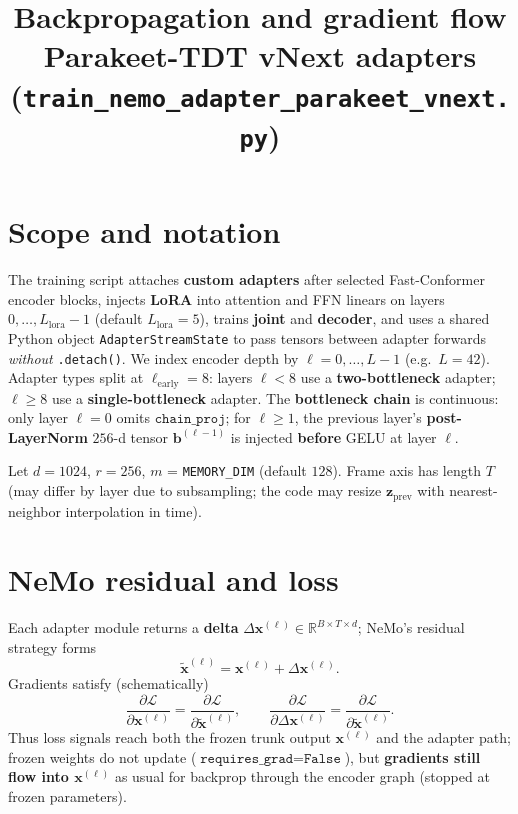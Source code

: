 \documentclass[11pt]{article}
\title{Backpropagation and gradient flow\\Parakeet-TDT vNext adapters (\texttt{train\_nemo\_adapter\_parakeet\_vnext.py})}
\author{}
\date{}
\newcommand{\R}{\mathbb{R}}
\begin{document}
\maketitle

\section{Scope and notation}

The training script attaches \textbf{custom adapters} after selected Fast-Conformer encoder blocks, injects \textbf{LoRA} into attention and FFN linears on layers $0,\ldots,L_{\text{lora}}-1$ (default $L_{\text{lora}}=5$), trains \textbf{joint} and \textbf{decoder}, and uses a shared Python object \texttt{AdapterStreamState} to pass tensors between adapter forwards \emph{without} \texttt{.detach()}. We index encoder depth by $\ell=0,\ldots,L-1$ (e.g.\ $L=42$). Adapter types split at $\ell_{\mathrm{early}}=8$: layers $\ell<8$ use a \textbf{two-bottleneck} adapter; $\ell\ge 8$ use a \textbf{single-bottleneck} adapter. The \textbf{bottleneck chain} is continuous: only layer $\ell=0$ omits $\texttt{chain\_proj}$; for $\ell\ge 1$, the previous layer's \textbf{post-LayerNorm} $256$-d tensor $\bm{b}^{(\ell-1)}$ is injected \textbf{before} GELU at layer $\ell$.

Let $d=1024$, $r=256$, $m$ = \texttt{MEMORY\_DIM} (default $128$). Frame axis has length $T$ (may differ by layer due to subsampling; the code may resize $\bm{z}_{\mathrm{prev}}$ with nearest-neighbor interpolation in time).

\section{NeMo residual and loss}

Each adapter module returns a \textbf{delta} $\Delta\bm{x}^{(\ell)} \in \R^{B\times T\times d}$; NeMo's residual strategy forms
\begin{equation}
  \tilde{\bm{x}}^{(\ell)} = \bm{x}^{(\ell)} + \Delta\bm{x}^{(\ell)}.
\end{equation}
Gradients satisfy (schematically)
\begin{equation}
  \frac{\partial \mathcal{L}}{\partial \bm{x}^{(\ell)}}
  = \frac{\partial \mathcal{L}}{\partial \tilde{\bm{x}}^{(\ell)}},
  \qquad
  \frac{\partial \mathcal{L}}{\partial \Delta\bm{x}^{(\ell)}}
  = \frac{\partial \mathcal{L}}{\partial \tilde{\bm{x}}^{(\ell)}}.
\end{equation}
Thus loss signals reach both the frozen trunk output $\bm{x}^{(\ell)}$ and the adapter path; frozen weights do not update ($\texttt{requires\_grad}=\texttt{False}$), but \textbf{gradients still flow into $\bm{x}^{(\ell)}$} as usual for backprop through the encoder graph (stopped at frozen parameters).
\end{document}
